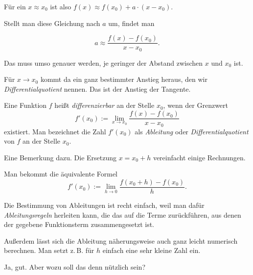 \documentclass{beamer}
\begin{document}
\begin{frame}
\vspace{0.8em}
Für ein $x\approx x_0$ ist also $f(x)\approx f(x_0)+a\cdot (x-x_0)$.
\pause

\vspace{0.8em}
Stellt man diese Gleichung nach $a$ um,\pause{} findet man

\[a \approx \frac{f(x)-f(x_0)}{x-x_0}.\]\pause

Das muss umso genauer werden, je geringer der Abstand zwischen
$x$ und $x_0$ ist.\pause

\vspace{0.8em}
Für $x\to x_0$ kommt da ein ganz bestimmter Anstieg heraus, den
wir \emph{Differentialquotient} nennen. Das ist der
Anstieg der Tangente.
\end{frame}

\begin{frame}
\begin{Definition}
Eine Funktion $f$ heißt \emph{differenzierbar}
an der Stelle $x_0$, wenn der Grenzwert
\[f'(x_0) := \lim_{x\to x_0}\frac{f(x)-f(x_0)}{x-x_0}\]
existiert. Man bezeichnet die Zahl $f'(x_0)$ als \emph{Ableitung} oder
\emph{Differentialquotient} von $f$ an der Stelle $x_0$.
\end{Definition}
\end{frame}

\begin{frame}
Eine Bemerkung dazu. Die Ersetzung $x=x_0+h$ vereinfacht einige
Rechnungen.\pause

\vspace{0.8em}
Man bekommt die äquivalente Formel
\[f'(x_0) := \lim_{h\to 0} \frac{f(x_0+h)-f(x_0)}{h}.\]
\end{frame}

\begin{frame}
Die Bestimmung von Ableitungen ist recht einfach, weil man dafür
\emph{Ableitungsregeln} herleiten kann, die das auf die Terme
zurückführen, aus denen der gegebene Funktionsterm
zusammengesetzt ist.\pause

\vspace{0.8em}
Außerdem lässt sich die Ableitung näherungsweise auch ganz leicht
numerisch berechnen. Man setzt z.\,B. für $h$ einfach eine sehr
kleine Zahl ein.
\end{frame}

\begin{frame}
Ja, gut. Aber wozu soll das denn nützlich sein?
\end{frame}
\end{document}

